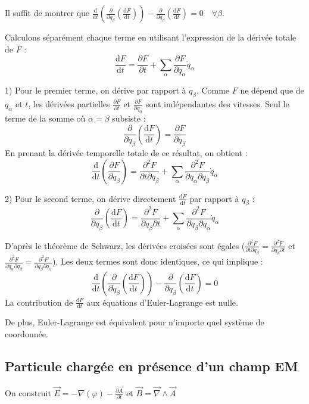 \documentclass[french]{yLectureNote}
\renewcommand{\vec}{\overrightarrow}
\newcommand{\dd}{\mathrm{d}}
\begin{document}
\begin{myproof}
    Il suffit de montrer que $\frac{\dd}{\dd t}\left(\frac{\partial}{\partial \dot{q}_{\beta}}\left(\frac{\dd F}{\dd t}\right)\right)-\frac{\partial }{\partial q_{\beta}}\left(\frac{\dd F}{\dd t}\right)=0 \quad \forall \beta$.

    Calculons séparément chaque terme en utilisant l'expression de la dérivée totale de $F$ :
    $$\frac{\dd F}{\dd t} = \frac{\partial F}{\partial t} + \sum_{\alpha} \frac{\partial F}{\partial q_{\alpha}}\dot{q}_{\alpha}$$

    1) Pour le premier terme, on dérive par rapport à $\dot{q}_{\beta}$. Comme $F$ ne dépend que de $q_{\alpha}$ et $t$, les dérivées partielles $\frac{\partial F}{\partial t}$ et $\frac{\partial F}{\partial q_{\alpha}}$ sont indépendantes des vitesses. Seul le terme de la somme où $\alpha = \beta$ subsiste :
    $$\frac{\partial}{\partial \dot{q}_{\beta}} \left( \frac{\dd F}{\dd t} \right) = \frac{\partial F}{\partial q_{\beta}}$$
    En prenant la dérivée temporelle totale de ce résultat, on obtient :
    $$\frac{\dd}{\dd t} \left( \frac{\partial F}{\partial q_{\beta}} \right) = \frac{\partial^2 F}{\partial t \partial q_{\beta}} + \sum_{\alpha} \frac{\partial^2 F}{\partial q_{\alpha} \partial q_{\beta}} \dot{q}_{\alpha}$$

    2) Pour le second terme, on dérive directement $\frac{\dd F}{\dd t}$ par rapport à $q_{\beta}$ :
    $$\frac{\partial}{\partial q_{\beta}} \left( \frac{\dd F}{\dd t} \right) = \frac{\partial^2 F}{\partial q_{\beta} \partial t} + \sum_{\alpha} \frac{\partial^2 F}{\partial q_{\beta} \partial q_{\alpha}} \dot{q}_{\alpha}$$

    D'après le théorème de Schwarz, les dérivées croisées sont égales ($\frac{\partial^2 F}{\partial t \partial q_{\beta}} = \frac{\partial^2 F}{\partial q_{\beta} \partial t}$ et $\frac{\partial^2 F}{\partial q_{\alpha} \partial q_{\beta}} = \frac{\partial^2 F}{\partial q_{\beta} \partial q_{\alpha}}$). Les deux termes sont donc identiques, ce qui implique :
    $$\frac{\dd}{\dd t}\left(\frac{\partial}{\partial \dot{q}_{\beta}}\left(\frac{\dd F}{\dd t}\right)\right) - \frac{\partial }{\partial q_{\beta}}\left(\frac{\dd F}{\dd t}\right) = 0$$
    La contribution de $\frac{\dd F}{\dd t}$ aux équations d'Euler-Lagrange est nulle.
\end{myproof}

De plus, Euler-Lagrange est équivalent pour n'importe quel système de coordonnée.
\subsection{Particule chargée en présence d'un champ EM}
On construit $\vec{E} = -\nabla(\varphi)-\frac{\partial \vec{A}}{\partial t}$ et $\vec{B} = \vec{\nabla}\wedge \vec{A}$
\end{document}
